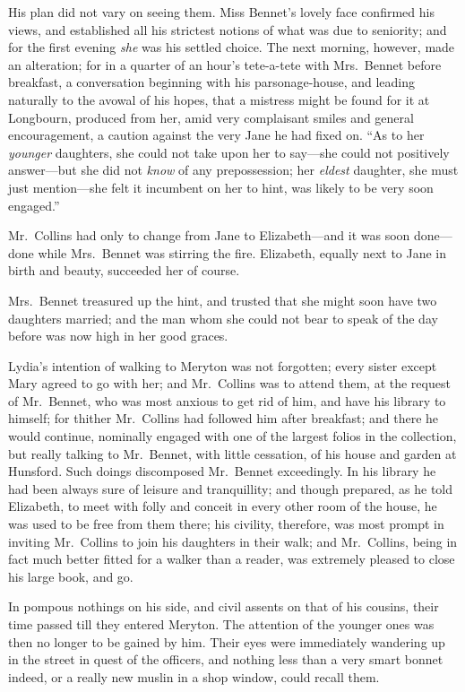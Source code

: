 His plan did not vary on seeing them.  Miss Bennet's lovely face
confirmed his views, and established all his strictest notions of
what was due to seniority; and for the first evening \emph{she} was his
settled choice.  The next morning, however, made an alteration;
for in a quarter of an hour's tete-a-tete with Mrs.\ Bennet before
breakfast, a conversation beginning with his parsonage-house,
and leading naturally to the avowal of his hopes, that a mistress
might be found for it at Longbourn, produced from her, amid
very complaisant smiles and general encouragement, a caution
against the very Jane he had fixed on.  ``As to her \emph{younger}
daughters, she could not take upon her to say---she could not
positively answer---but she did not \emph{know} of any prepossession;
her \emph{eldest} daughter, she must just mention---she felt it
incumbent on her to hint, was likely to be very soon engaged.''

Mr.\ Collins had only to change from Jane to Elizabeth---and it
was soon done---done while Mrs.\ Bennet was stirring the fire.
Elizabeth, equally next to Jane in birth and beauty, succeeded
her of course.

Mrs.\ Bennet treasured up the hint, and trusted that she might
soon have two daughters married; and the man whom she could
not bear to speak of the day before was now high in her good
graces.

Lydia's intention of walking to Meryton was not forgotten;
every sister except Mary agreed to go with her; and Mr.\ Collins
was to attend them, at the request of Mr.\ Bennet, who was most
anxious to get rid of him, and have his library to himself; for
thither Mr.\ Collins had followed him after breakfast; and there he
would continue, nominally engaged with one of the largest folios
in the collection, but really talking to Mr.\ Bennet, with little
cessation, of his house and garden at Hunsford.  Such doings
discomposed Mr.\ Bennet exceedingly.  In his library he had been
always sure of leisure and tranquillity; and though prepared, as
he told Elizabeth, to meet with folly and conceit in every other
room of the house, he was used to be free from them there; his
civility, therefore, was most prompt in inviting Mr.\ Collins to
join his daughters in their walk; and Mr.\ Collins, being in fact
much better fitted for a walker than a reader, was extremely
pleased to close his large book, and go.

In pompous nothings on his side, and civil assents on that of
his cousins, their time passed till they entered Meryton.  The
attention of the younger ones was then no longer to be gained by
him.  Their eyes were immediately wandering up in the street in
quest of the officers, and nothing less than a very smart bonnet
indeed, or a really new muslin in a shop window, could recall
them.

